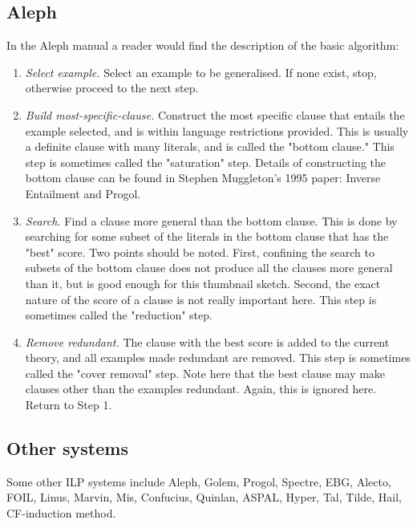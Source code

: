 \subsection{Aleph}
In the Aleph manual\cite{aleph2007} a reader would find the description of the basic algorithm:
\begin{enumerate}
\item \emph{Select example.} Select an example to be generalised. If none exist, stop, otherwise proceed to the next step.
\item \emph{Build most-specific-clause.} Construct the most specific clause that entails the example selected, and is within language restrictions provided. This is usually a definite clause with many literals, and is called the "bottom clause." This step is sometimes called the "saturation" step. Details of constructing the bottom clause can be found in Stephen Muggleton's 1995 paper: Inverse Entailment and Progol\cite{muggleton1995}.
\item \emph{Search.} Find a clause more general than the bottom clause. This is done by searching for some subset of the literals in the bottom clause that has the "best" score. Two points should be noted. First, confining the search to subsets of the bottom clause does not produce all the clauses more general than it, but is good enough for this thumbnail sketch. Second, the exact nature of the score of a clause is not really important here. This step is sometimes called the "reduction" step.
\item \emph{Remove redundant.} The clause with the best score is added to the current theory, and all examples made redundant are removed. This step is sometimes called the "cover removal" step. Note here that the best clause may make clauses other than the examples redundant. Again, this is ignored here. Return to Step 1.
\end{enumerate}

\subsection{Other systems}
Some other ILP systems include Aleph, Golem, Progol,
Spectre, EBG, Alecto, FOIL, Linus, Marvin, Mis, Confucius, Quinlan, ASPAL, Hyper, Tal, Tilde, Hail, CF-induction method.

